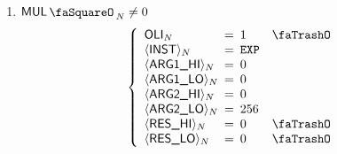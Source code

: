 \begin{enumerate}[resume]
	\item \If $\mulStamp_{N} \neq 0$ \Then
	\[
	\left\{
	\begin{array}{lclr}
		\oli_{N} & \!\!\! = \!\!\! & 1 & \trash \\
		\iInst_{N} & \!\!\! = \!\!\! & \inst{EXP} & \\
		\iArgOneHi_{N} & \!\!\! = \!\!\! & 0 & \\
		\iArgOneLo_{N} & \!\!\! = \!\!\! & 0 & \\
		\iArgTwoHi_{N} & \!\!\! = \!\!\! & 0 & \\
		\iArgTwoLo_{N} & \!\!\! = \!\!\! & 256 & \\
		\iResHi_{N} & \!\!\! = \!\!\! & 0 & \trash \\
		\iResLo_{N} & \!\!\! = \!\!\! & 0 & \trash \\
	\end{array}
	\right.
	\]
	\iffalse
	\begin{enumerate}
		\item $\ct_{N} = \mmediumMO$
		\item \If $\iInst_{N} = \inst{EXP}$ \et $\resVanishes_{N} = 0$ \Then
		\begin{enumerate}
			\item $\expBitSrc_{N} = 1$
			\item $\snm_{N} = \expBit_{N}$
			\item $\expBitAcc_{N} = \iArgTwoLo_{N}$
			\item \If $\iArgTwoHi_{N} \neq 0$ \Then $\nBits_{N} = \oneTwoSeven$
			\item and the \textbf{target constraint}
			\[
			\begin{cases}
				\iResHi_{N} = \theta \cdot \col{C\_3}_{N} + \col{C\_2}_{N} \\
				\iResLo_{N} = \theta \cdot \col{C\_1}_{N} + \col{C\_0}_{N} \\
			\end{cases}
			\]
			where $\col{C\_k}$, for $k=3,2,1,0$, are aliases defined in section~\ref{subsec: (alu/mul) aliases}.
		\end{enumerate}
	\end{enumerate}
	\fi
\end{enumerate}
\iffalse
Some notes:
\begin{enumerate}
	\item $\oli$ will be stamp-constant (section~\ref{subsec (alu/exp): constancies}) by construction (section~\ref{subsec (alu/exp): tiny base, tiny exponent, oli and result vanishes binary columns})
\end{enumerate}
\noindent We say that an instruction is
\emph{trivial} if $\oli_{i} = 1$ and
\emph{nontrivial} if $\oli_{i} = 0$. Trivial instructions thus take up a single row of processing.

Note that the following two facts (a) $\mulStamp_{i} = 0 \implies \iInst_{i} = 0$ and (b) the multiplier only deals with two instructions, imply that we may replace conditions such as
``\If $\mulStamp_{i} \neq 0$ \et $\iInst_{i} = \inst{MUL}$'' with ``\If $\mulStamp_{i} \neq 0$ \et $\iInst_{i} \neq \inst{EXP}$'' and similarly
``\If $\mulStamp_{i} \neq 0$ \et $\iInst_{i} = \inst{EXP}$'' with ``\If $\mulStamp_{i} \neq 0$ \et $\iInst_{i} \neq \inst{MUL}$''.
\fi
